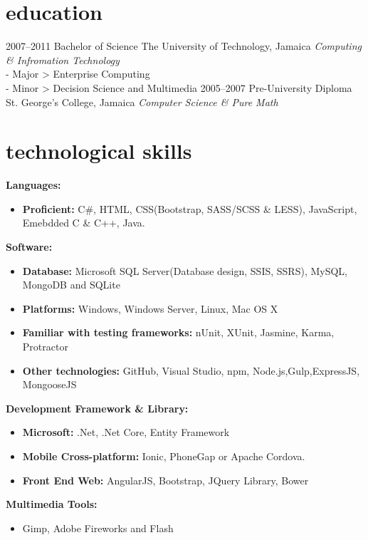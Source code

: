\documentclass[]{friggeri-cvRS}
\begin{document}
\section{education}

\begin{entrylist}
  \entry
    {2007–2011}
    {Bachelor  {\normalfont of Science}}
    {The University of Technology, Jamaica}
    {\emph{ Computing \& Infromation Technology}}
    {\\-  Major > Enterprise Computing\\-  Minor > Decision Science and Multimedia}
  \entry
    {2005–2007}
    {Pre-University Diploma}
    {St. George's College, Jamaica}
    {\emph{Computer Science \& Pure Math}}{}
\end{entrylist}


\section{technological skills}
\textbf{Languages:}
\begin{itemize}
	\item \textbf{Proficient:} C\#, HTML, CSS(Bootstrap, SASS/SCSS \& LESS), JavaScript, Emebdded C \& C++, Java.
\end{itemize}
\textbf{Software:}
\begin{itemize}
	\item \textbf{Database:} Microsoft SQL Server(Database design, SSIS, SSRS), MySQL, MongoDB and SQLite 
	\item \textbf{Platforms:} Windows, Windows Server, Linux, Mac OS X
	\item \textbf{Familiar with testing frameworks:} nUnit, XUnit, Jasmine, Karma, Protractor
	\item \textbf{Other technologies:} GitHub, Visual Studio, npm, Node.js,Gulp,ExpressJS, MongooseJS
\end{itemize}
\textbf{Development Framework \& Library:}
\begin{itemize}
	\item \textbf{Microsoft:} .Net, .Net Core, Entity Framework
	\item \textbf{Mobile Cross-platform:} Ionic, PhoneGap or Apache Cordova.
	\item \textbf{Front End Web:} AngularJS, Bootstrap, JQuery Library, Bower
\end{itemize}
\textbf{Multimedia Tools:}
\begin{itemize}
	\item Gimp, Adobe Fireworks and Flash  
\end{itemize}
\end{document}
